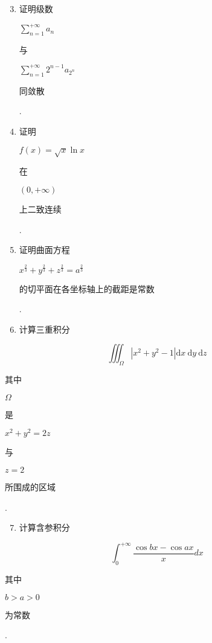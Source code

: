 \documentclass[10pt]{article}
\begin{document}
\begin{enumerate}
  \setcounter{enumi}{2}
  \item \begin{CJK}{UTF8}{mj}证明级数\end{CJK} $\sum_{n=1}^{+\infty} a_{n}$ \begin{CJK}{UTF8}{mj}与\end{CJK} $\sum_{n=1}^{+\infty} 2^{n-1} a_{2^{n}}$ \begin{CJK}{UTF8}{mj}同敛散\end{CJK}.

  \item \begin{CJK}{UTF8}{mj}证明\end{CJK} $f(x)=\sqrt{x} \ln x$ \begin{CJK}{UTF8}{mj}在\end{CJK} $(0,+\infty)$ \begin{CJK}{UTF8}{mj}上二致连续\end{CJK}.

  \item \begin{CJK}{UTF8}{mj}证明曲面方程\end{CJK} $x^{\frac{2}{3}}+y^{\frac{2}{3}}+z^{\frac{2}{3}}=a^{\frac{2}{3}}$ \begin{CJK}{UTF8}{mj}的切平面在各坐标轴上的截距是常数\end{CJK}.

  \item \begin{CJK}{UTF8}{mj}计算三重积分\end{CJK}

\end{enumerate}
$$
\iiint_{\Omega}\left|x^{2}+y^{2}-1\right| \mathrm{d} x \mathrm{~d} y \mathrm{~d} z
$$
\begin{CJK}{UTF8}{mj}其中\end{CJK} $\Omega$ \begin{CJK}{UTF8}{mj}是\end{CJK} $x^{2}+y^{2}=2 z$ \begin{CJK}{UTF8}{mj}与\end{CJK} $z=2$ \begin{CJK}{UTF8}{mj}所围成的区域\end{CJK}.

\begin{enumerate}
  \setcounter{enumi}{6}
  \item \begin{CJK}{UTF8}{mj}计算含参积分\end{CJK}
\end{enumerate}
$$
\int_{0}^{+\infty} \frac{\cos b x-\cos a x}{x} d x
$$
\begin{CJK}{UTF8}{mj}其中\end{CJK} $b>a>0$ \begin{CJK}{UTF8}{mj}为常数\end{CJK}.
\end{document}
